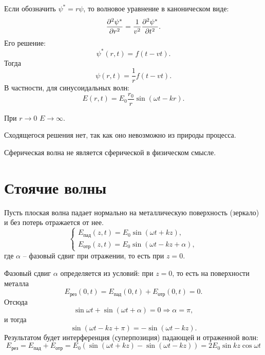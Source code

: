 	Если обозначить \( \psi^* = r\psi \), то волновое уравнение в каноническом
    виде:
	\[
        \frac{\partial^2 \psi^*}{\partial r^2} = \frac{1}{v^2}\frac{\partial^2 \psi^*}{\partial t^2}.
    \]
	Его решение:
	\[
        \psi^*(r, t) = f(t - vt).
    \]
	Тогда
	\[
        \psi(r, t) = \frac{1}{r}f(t - vt).
    \]
	В частности, для синусоидальных волн:
	\[
        E(r, t) = E_0\frac{r_0}{r}\sin(\omega t - kr).
    \]
	
	\begin{remark}
        При \( r \to 0 \) \( E \to \infty \).
	\end{remark}
	
	\begin{remark}
        Сходящегося решения нет, так как оно невозможно из природы процесса.
	\end{remark}
	
	\begin{remark}
        Сферическая волна не является сферической в физическом смысле.
	\end{remark}
	
\section{Стоячие волны}

	Пусть плоская волна падает нормально на металлическую  поверхность (зеркало)
    и без потерь отражается от нее.
	\[
        \left\{
        \begin{array}{l}
            E_\textit{пад}(z, t) = E_0\sin(\omega t + kz), \\
            E_\textit{отр}(z, t) = E_0\sin(\omega t - kz + \alpha),
        \end{array}
        \right.
    \]
	где \( \alpha \) -- фазовый сдвиг при отражении, то есть при \( z = 0 \).
	
	Фазовый сдвиг \( \alpha \) определяется из условий: при \( z = 0 \), то есть
    на поверхности металла
	\[
        E_\textit{рез}(0, t) = E_\textit{пад}(0, t) + E_\textit{отр}(0, t) = 0.
    \]
	Отсюда
    \[
        \sin\omega t + \sin(\omega t + \alpha) = 0 \Rightarrow \alpha = \pi,
    \]
	и тогда
    \[
        \sin(\omega t - kz + \pi) = -\sin(\omega t - kz).
    \]
	Результатом будет интерференция (суперпозиция) падающей и отраженной волн:
	\begin{equation}
		E_\textit{рез} = E_\textit{пад} + E_\textit{отр} =
        E_0\left(\sin(\omega t + kz) - \sin(\omega t - kz)\right) =
        2E_0\sin kz\cos\omega t
        \label{eq20.2:1}
	\end{equation}
	
